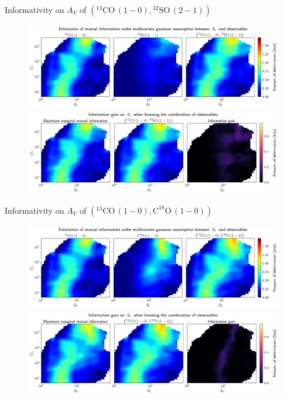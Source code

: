 \documentclass{beamer}
\begin{document}
\begin{frame}{Informativity on $A_V$ of $\left(\mathrm{^{13}CO\,(1-0)},\mathrm{^{32}SO\,(2-1)}\right)$}
    \begin{figure}
        \centering
        \includegraphics[width=0.95\linewidth]{../linearinfo/av__13co10_32so21_linearinfo.png}
        \vfill
        \includegraphics[width=0.95\linewidth]{../linearinfo/av__13co10_32so21_linearinfo_gain.png}
    \end{figure}
\end{frame}

\begin{frame}{Informativity on $A_V$ of $\left(\mathrm{^{13}CO\,(1-0)},\mathrm{C^{18}O\,(1-0)}\right)$}
    \begin{figure}
        \centering
        \includegraphics[width=0.95\linewidth]{../linearinfo/av__13co10_c18o10_linearinfo.png}
        \vfill
        \includegraphics[width=0.95\linewidth]{../linearinfo/av__13co10_c18o10_linearinfo_gain.png}
    \end{figure}
\end{frame}
\end{document}
